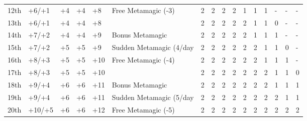\begin{table}[htb]
\begin{small}
\begin{tabular}{lp{1.2cm}p{0.7cm}p{0.7cm}p{0.7cm}p{4.7cm}llllllllll}
12th   &+6/+1  &+4 &+4 &+8  & Free Metamagic (-3)     &2 &2 &2 &2 &1 &1 &1 &- &- &- \\
13th   &+6/+1  &+4 &+4 &+8  &                         &2 &2 &2 &2 &2 &1 &1 &0 &- &- \\
14th   &+7/+2  &+4 &+4 &+9  & Bonus Metamagic         &2 &2 &2 &2 &2 &1 &1 &1 &- &- \\
15th   &+7/+2  &+5 &+5 &+9  & Sudden Metamagic (4/day &2 &2 &2 &2 &2 &2 &1 &1 &0 &- \\
16th   &+8/+3  &+5 &+5 &+10 & Free Metamagic (-4)     &2 &2 &2 &2 &2 &2 &1 &1 &1 &- \\
17th   &+8/+3  &+5 &+5 &+10 &                         &2 &2 &2 &2 &2 &2 &2 &1 &1 &0 \\
18th   &+9/+4  &+6 &+6 &+11 & Bonus Metamagic         &2 &2 &2 &2 &2 &2 &2 &1 &1 &1 \\
19th   &+9/+4  &+6 &+6 &+11 & Sudden Metamagic (5/day &2 &2 &2 &2 &2 &2 &2 &2 &1 &1 \\
20th   &+10/+5 &+6 &+6 &+12 & Free Metamagic (-5)     &2 &2 &2 &2 &2 &2 &2 &2 &2 &2 \\
\end{tabular}
\end{small}
\end{table}
  

